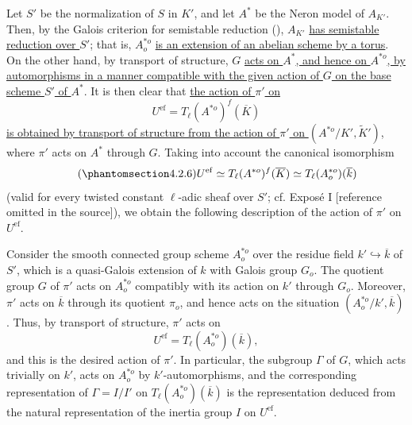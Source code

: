 Let $S'$ be the normalization of $S$ in $K'$, and let $A^*$ be the
Neron model of $A_{K'}$.  Then, by the Galois criterion for semistable
reduction (), $A_{K'}$ \underline{has semistable reduction over
$S'$}; that is, $A^{*o}_o$ \underline{is an extension of an abelian
scheme by a torus}.  On the other hand, by transport of structure, $G$
\underline{acts on $A^*$, and hence on $A^{*o}$, by automorphisms in a
manner compatible with the given action of $G$ on the base scheme $S'$
of $A^*$}.  It is then clear that \underline{the action of $\pi'$ on}
\[
 U^{\mathrm{ef}}=T_\ell(A^{*o})^f(\overline K)
\]
\underline{is obtained by transport of structure from the action of
$\pi'$ on $(A^{*o}/K',\widetilde K')$}, where $\pi'$ acts on $A^*$
through $G$.  Taking into account the canonical isomorphism
\begin{equation}\tag{\SGARefTarget{sga7.sga7i.eix.n4-2-6}{4.2.6}}
 U^{\mathrm{ef}}\simeq T_\ell(A^{*o})^f(\overline K)
 \simeq T_\ell(A^{*o}_o)(\overline k)
\end{equation}
(valid for every twisted constant $\ell$-adic sheaf over $S'$; cf.
Expos\'e I [reference omitted in the source]), we obtain the following
description of the action of $\pi'$ on $U^{\mathrm{ef}}$.

Consider the smooth connected group scheme $A^{*o}_o$ over the residue
field $k'\hookrightarrow\overline k$ of $S'$, which is a quasi-Galois
extension of $k$ with Galois group $G_o$.  The quotient group $G$ of
$\pi'$ acts on $A^{*o}_o$ compatibly with its action on $k'$ through
$G_o$.  Moreover, $\pi'$ acts on $\overline k$ through its quotient
$\pi_o$, and hence acts on the situation
$(A^{*o}_o/k',\overline k)$.  Thus, by transport of structure, $\pi'$
acts on
\[
 U^{\mathrm{ef}}=T_\ell(A^{*o}_o)(\overline k),
\]
and this is the desired action of $\pi'$.  In particular, the subgroup
$\Gamma$ of $G$, which acts trivially on $k'$, acts on $A^{*o}_o$ by
$k'$-automorphisms, and the corresponding representation of
$\Gamma=I/I'$ on $T_\ell(A^{*o}_o)(\overline k)$ is the representation
deduced from the natural representation of the inertia group $I$ on
$U^{\mathrm{ef}}$.


